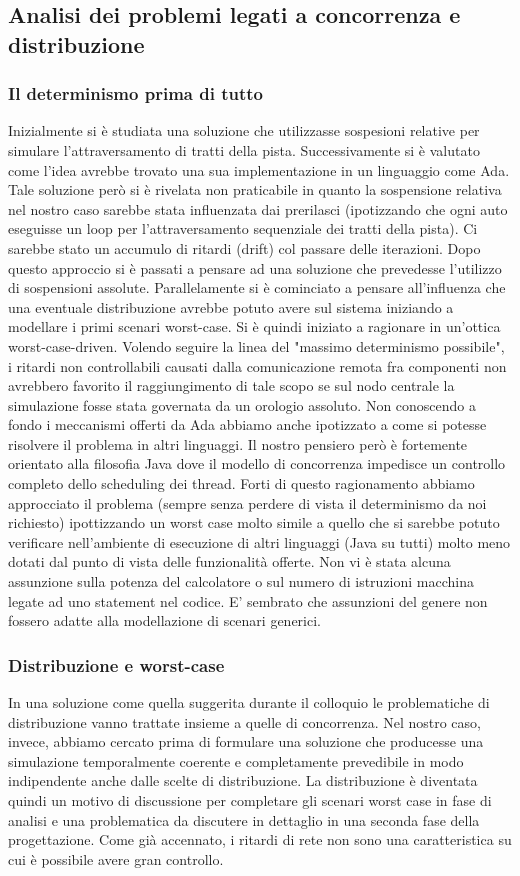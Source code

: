 \subsection{Analisi dei problemi legati a concorrenza e distribuzione}
\subsubsection{Il determinismo prima di tutto}
Inizialmente si è studiata una soluzione che utilizzasse sospesioni relative per simulare l'attraversamento di tratti della pista. Successivamente si è valutato come l'idea avrebbe trovato una sua implementazione in un linguaggio come Ada.
Tale soluzione però si è rivelata non praticabile in quanto la sospensione relativa nel nostro caso sarebbe stata influenzata dai prerilasci (ipotizzando che ogni auto eseguisse un loop per l’attraversamento sequenziale dei tratti della pista). Ci sarebbe stato un accumulo di ritardi (drift) col passare delle iterazioni. Dopo questo approccio si è passati a pensare ad una soluzione che prevedesse l'utilizzo di sospensioni assolute. Parallelamente si è cominciato a pensare all'influenza che una eventuale distribuzione avrebbe potuto avere sul sistema iniziando a modellare i primi scenari worst-case.
Si è quindi iniziato a ragionare in un’ottica worst-case-driven.
Volendo seguire la linea del "massimo determinismo possibile", i ritardi non controllabili causati dalla comunicazione remota fra componenti non avrebbero favorito il raggiungimento di tale scopo se sul nodo centrale la simulazione fosse stata governata da un orologio assoluto. Non conoscendo a fondo i meccanismi offerti da Ada abbiamo anche ipotizzato a come si potesse risolvere il problema in altri linguaggi.
Il nostro pensiero però è fortemente orientato alla filosofia Java dove il modello di concorrenza impedisce un controllo completo dello scheduling dei thread.
Forti di questo ragionamento abbiamo approcciato il problema (sempre senza perdere di vista il determinismo da noi richiesto)  ipottizzando un worst case molto simile a quello che si sarebbe potuto verificare nell’ambiente di esecuzione di altri linguaggi (Java su tutti) molto meno dotati dal punto di vista delle funzionalità offerte.
Non vi è stata alcuna assunzione sulla potenza del calcolatore o sul numero di istruzioni macchina legate ad uno statement nel codice. E’ sembrato che assunzioni del genere non fossero adatte alla modellazione di scenari generici.
\subsubsection{Distribuzione e worst-case}
In una soluzione come quella suggerita durante il colloquio le problematiche di distribuzione vanno trattate insieme a quelle di concorrenza.
Nel nostro caso, invece, abbiamo cercato prima di formulare una soluzione che producesse una simulazione temporalmente coerente e completamente prevedibile in modo indipendente anche dalle scelte di distribuzione. La distribuzione è diventata quindi un motivo di discussione per completare gli scenari worst case in fase di analisi e una problematica da discutere in dettaglio in una seconda fase della progettazione. Come già accennato, i ritardi di rete non sono una caratteristica su cui è possibile avere gran controllo.
